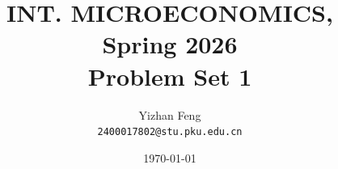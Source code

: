 \title{\textbf{INT. MICROECONOMICS, Spring 2026} \\[0.5em]
    \Large Problem Set 1}
\author{Yizhan Feng \\ 
    \normalsize{\texttt{2400017802@stu.pku.edu.cn}}}
\date{\today}